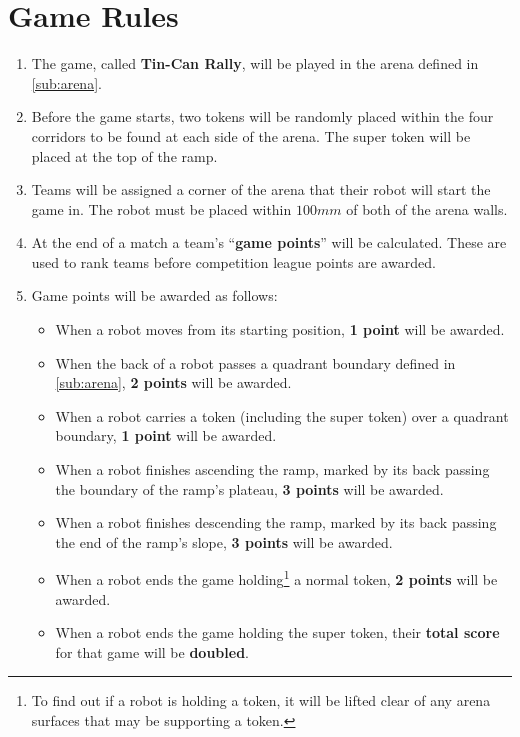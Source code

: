 \section {Game Rules}
\label{game-rules}

\begin{enumerate}
\item The game, called \textbf{Tin-Can Rally}, will be played in the arena defined in \autoref{sub:arena}.
\item Before the game starts, two tokens will be randomly placed within the four corridors to be found at each side of the arena.  The super token will be placed at the top of the ramp.
\item Teams will be assigned a corner of the arena that their robot will start the game in.
 The robot must be placed within $100mm$ of both of the arena walls.
\item At the end of a match a team's ``\textbf{game points}'' will be calculated.
 These are used to rank teams before competition league points are awarded.

\item Game points will be awarded as follows:

\begin{itemize}
\item When a robot moves from its starting position, \textbf{1 point} will be awarded.
\item When the back of a robot passes a quadrant boundary defined in \autoref{sub:arena}, \textbf{2 points} will be awarded.
\item When a robot carries a token (including the super token) over a quadrant boundary, \textbf{1 point} will be awarded.
\item When a robot finishes ascending the ramp, marked by its back passing the boundary of the ramp's plateau, \textbf{3 points} will be awarded.
\item When a robot finishes descending the ramp, marked by its back passing the end of the ramp's slope, \textbf{3 points} will be awarded.
\item When a robot ends the game holding\footnote{To find out if a robot is holding a token, it will be lifted clear of any arena surfaces that may be supporting a token.} a normal token, \textbf{2 points} will be awarded.
\item When a robot ends the game holding the super token, their \textbf{total score} for that game will be \textbf{doubled}.
\end{itemize}


\end{enumerate}
